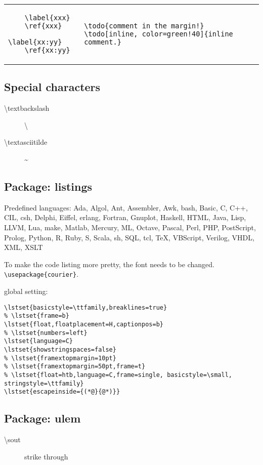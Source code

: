 \begin{tabular}{@{}l|l@{}}
  \begin{lstlisting}
    \label{xxx}
    \ref{xxx}
    \label{xx:yy}
    \ref{xx:yy}
  \end{lstlisting}&
\begin{lstlisting}
\todo{comment in the margin!}
\todo[inline, color=green!40]{inline comment.}
\end{lstlisting}
\end{tabular}

\subsection{Special characters}
\begin{description}
\item [\textbackslash textbackslash] \textbackslash
\item [\textbackslash textasciitilde] \textasciitilde
\end{description}




\subsection{Package: listings}
Predefined languages:
Ada, Algol, Ant, Assembler, Awk, bash, Basic, C, C++, CIL, csh,
Delphi, Eiffel, erlang, Fortran, Gnuplot, Haskell, HTML, Java, Lisp,
LLVM, Lua, make, Matlab, Mercury, ML, Octave, Pascal, Perl, PHP,
PostScript, Prolog, Python, R, Ruby, S, Scala, sh, SQL, tcl, TeX,
VBScript, Verilog, VHDL, XML, XSLT


To make the code listing more pretty, the font needs to be changed.
\verb$\usepackage{courier}$.

global setting:

\begin{lstlisting}
\lstset{basicstyle=\ttfamily,breaklines=true}
% \lstset{frame=b}
\lstset{float,floatplacement=H,captionpos=b}
% \lstset{numbers=left}
\lstset{language=C}
\lstset{showstringspaces=false}
% \lstset{framextopmargin=10pt}
% \lstset{framextopmargin=50pt,frame=t}
% \lstset{float=htb,language=C,frame=single, basicstyle=\small, stringstyle=\ttfamily}
\lstset{escapeinside={(*@}{@*)}}
\end{lstlisting}

\subsection{Package: ulem}

\begin{description}
\item [\textbackslash sout] strike through
\end{description}



